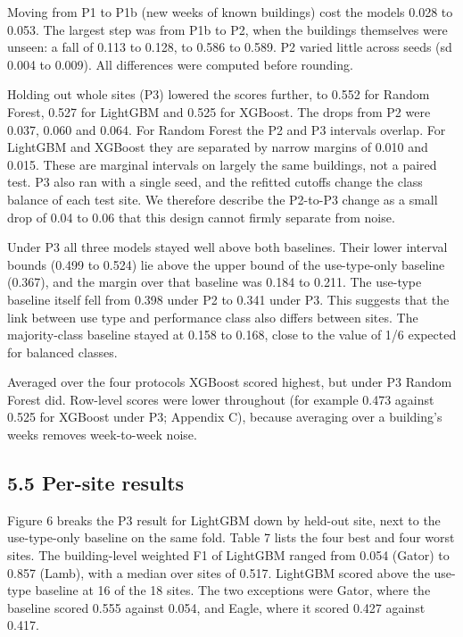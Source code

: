 \documentclass[
  10pt,
]{article}
\begin{document}
Moving from P1 to P1b (new weeks of known buildings) cost the models
0.028 to 0.053. The largest step was from P1b to P2, when the buildings
themselves were unseen: a fall of 0.113 to 0.128, to 0.586 to 0.589. P2
varied little across seeds (sd 0.004 to 0.009). All differences were
computed before rounding.

Holding out whole sites (P3) lowered the scores further, to 0.552 for
Random Forest, 0.527 for LightGBM and 0.525 for XGBoost. The drops from
P2 were 0.037, 0.060 and 0.064. For Random Forest the P2 and P3
intervals overlap. For LightGBM and XGBoost they are separated by narrow
margins of 0.010 and 0.015. These are marginal intervals on largely the
same buildings, not a paired test. P3 also ran with a single seed, and
the refitted cutoffs change the class balance of each test site. We
therefore describe the P2-to-P3 change as a small drop of 0.04 to 0.06
that this design cannot firmly separate from noise.

Under P3 all three models stayed well above both baselines. Their lower
interval bounds (0.499 to 0.524) lie above the upper bound of the
use-type-only baseline (0.367), and the margin over that baseline was
0.184 to 0.211. The use-type baseline itself fell from 0.398 under P2 to
0.341 under P3. This suggests that the link between use type and
performance class also differs between sites. The majority-class
baseline stayed at 0.158 to 0.168, close to the value of 1/6 expected
for balanced classes.

Averaged over the four protocols XGBoost scored highest, but under P3
Random Forest did. Row-level scores were lower throughout (for example
0.473 against 0.525 for XGBoost under P3; Appendix C), because averaging
over a building's weeks removes week-to-week noise.

\hypertarget{per-site-results}{%
\subsection{5.5 Per-site results}\label{per-site-results}}

Figure 6 breaks the P3 result for LightGBM down by held-out site, next
to the use-type-only baseline on the same fold. Table 7 lists the four
best and four worst sites. The building-level weighted F1 of LightGBM
ranged from 0.054 (Gator) to 0.857 (Lamb), with a median over sites of
0.517. LightGBM scored above the use-type baseline at 16 of the 18
sites. The two exceptions were Gator, where the baseline scored 0.555
against 0.054, and Eagle, where it scored 0.427 against 0.417.
\end{document}
